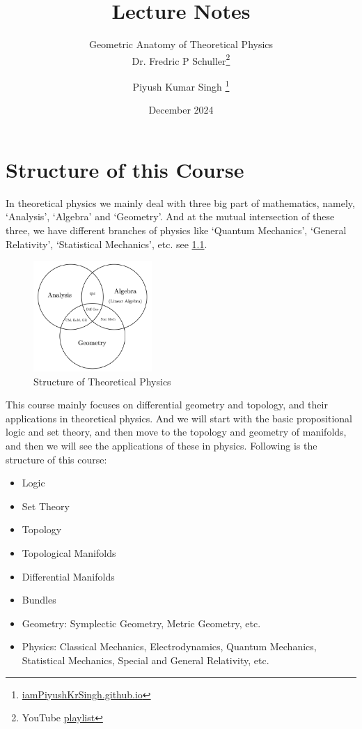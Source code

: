 \documentclass[11pt, oneside]{scrbook}
\title{
    \Huge Lecture Notes
}
\subtitle{
    \huge Geometric Anatomy of Theoretical Physics \\[10pt]
    \LARGE\normalfont\sffamily Dr. Fredric P Schuller\thanks{YouTube \href{https://youtube.com/playlist?list=PLPH7f_7ZlzxTi6kS4vCmv4ZKm9u8g5yic&si=Uy5ciENkuiTlvx6X}{playlist}}
}
\author{
\Large Piyush Kumar Singh \thanks{{\href{https://iampiyushkrsingh.github.io}{iamPiyushKrSingh.github.io}}}
}
\date{
    \large December 2024
}
\newcommand{\0}{\emptyset}
\begin{document}
\frontmatter
\begin{titlepage}
	\let\newpage\relax
	\singhtitle
\end{titlepage}

\chapter{Structure of this Course}
\noindent In theoretical physics we mainly deal with three big part of mathematics, namely, `Analysis', `Algebra' and `Geometry'. And at the mutual intersection of these three, we have different branches of physics like `Quantum Mechanics', `General Relativity', `Statistical Mechanics', etc. see \cref{fig:structure}.

\begin{figure}[H]
	\centering
	\includegraphics[width=0.4\textwidth]{lec01-math_struct.png}
	\caption{Structure of Theoretical Physics}
	\label{fig:structure}
\end{figure}\noindent
This course mainly focuses on differential geometry and topology, and their applications in theoretical physics. And we will start with the basic propositional logic and set theory, and then move to the topology and geometry of manifolds, and then we will see the applications of these in physics. Following is the structure of this course:

\begin{itemize}
	\item Logic
	\item Set Theory
	\item Topology
	\item Topological Manifolds
	\item Differential Manifolds
	\item Bundles
	\item Geometry: Symplectic Geometry, Metric Geometry, etc.
	\item Physics: Classical Mechanics, Electrodynamics, Quantum Mechanics, Statistical Mechanics, Special and General Relativity, etc.
\end{itemize}


\tableofcontents
{}

\mainmatter






\end{document}
